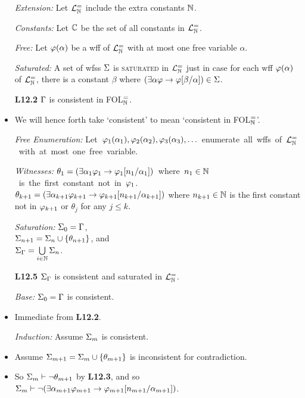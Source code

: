 \documentclass[a4paper, 11pt]{article} %
\begin{document}
\begin{itemize}
  \item[\it Extension:] Let $\mathcal{L}^{=}_{\mathbb{N}}$ include the extra constants $\mathbb{N}$.
  \item[\it Constants:] Let $\mathbb{C}$ be the set of all constants in $\mathcal{L}^{=}_{\mathbb{N}}$.
  \item[\it Free:] Let $\varphi(\alpha)$ be a wff of $\mathcal{L}^{=}_{\mathbb{N}}$ with at most one free variable $\alpha$.
  \item[\it Saturated:] A set of wfss $\Sigma$ is \textsc{saturated} in $\mathcal{L}^{=}_{\mathbb{N}}$ just in case for each wff $\varphi(\alpha)$ of $\mathcal{L}^{=}_{\mathbb{N}}$, there is a constant $\beta$ where $(\exists \alpha\varphi \rightarrow \varphi[\beta/\alpha])\in\Sigma$.
  \item[\bf L12.2] $\Gamma$ is consistent in FOL$^=_{\mathbb{N}}$.
    \item We will hence forth take `consistent' to mean `consistent in FOL$^=_{\mathbb{N}}$'.
  \item[\it Free Enumeration:] \mbox{Let $\varphi_1(\alpha_1),\varphi_2(\alpha_2),\varphi_3(\alpha_3),\ldots$ enumerate all wffs of $\mathcal{L}^{=}_{\mathbb{N}}$ with at most one free variable.}
  \item[\it Witnesses:] \mbox{$\theta_1=(\exists \alpha_1\varphi_1\rightarrow \varphi_1[n_1/\alpha_1])$ where $n_1\in\mathbb{N}$ is the first constant not in $\varphi_1$.}\vspace{.05in}\\
    $\theta_{k+1}=(\exists \alpha_{k+1}\varphi_{k+1}\rightarrow \varphi_{k+1}[n_{k+1}/\alpha_{k+1}])$  where $n_{k+1}\in\mathbb{N}$ is the first constant not in $\varphi_{k+1}$ or $\theta_j$ for any $j\leq k$.
  \item[\it Saturation:]
    $\Sigma_0 = \Gamma$,\\
    $\Sigma_{n+1} = \Sigma_n\cup\lbrace\theta_{n+1}\rbrace$, and\\
    $\Sigma_{\Gamma} = \bigcup\limits_{i\in\mathbb{N}}\Sigma_n$.
  \item[\bf L12.5] $\Sigma_{\Gamma}$ is consistent and saturated in $\mathcal{L}^{=}_{\mathbb{N}}$.
    \item[\it Base:] $\Sigma_0 = \Gamma$ is consistent. 
      \item Immediate from \textbf{L12.2}.
    \item[\it Induction:] Assume $\Sigma_m$ is consistent. 
    \item Assume $\Sigma_{m+1} = \Sigma_m \cup \lbrace\theta_{m+1}\rbrace$ is inconsistent for contradiction.
    \item So $\Sigma_m \vdash \neg\theta_{m+1}$ by \textbf{L12.3}, and so $\Sigma_m \vdash \neg (\exists \alpha_{m+1}\varphi_{m+1}\rightarrow \varphi_{m+1}[n_{m+1}/\alpha_{m+1}])$.

\end{itemize}
\end{document}
